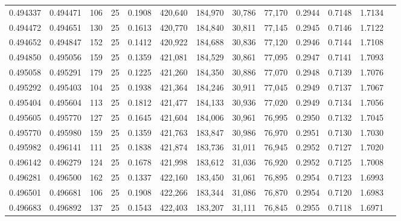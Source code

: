 \begin{tabular}{rrrrrrrrrrrrr}
0.494337 & 0.494471 &   106 &  25 &                                     0.1908 & 420,640 & 184,970 &  30,786 &  77,170 & 0.2944 & 0.7148 & 1.7134 \\
0.494472 & 0.494651 &   130 &  25 &                                     0.1613 & 420,770 & 184,840 &  30,811 &  77,145 & 0.2945 & 0.7146 & 1.7122 \\
0.494652 & 0.494847 &   152 &  25 &                                     0.1412 & 420,922 & 184,688 &  30,836 &  77,120 & 0.2946 & 0.7144 & 1.7108 \\
0.494850 & 0.495056 &   159 &  25 &                                     0.1359 & 421,081 & 184,529 &  30,861 &  77,095 & 0.2947 & 0.7141 & 1.7093 \\
0.495058 & 0.495291 &   179 &  25 &                                     0.1225 & 421,260 & 184,350 &  30,886 &  77,070 & 0.2948 & 0.7139 & 1.7076 \\
0.495292 & 0.495403 &   104 &  25 &                                     0.1938 & 421,364 & 184,246 &  30,911 &  77,045 & 0.2949 & 0.7137 & 1.7067 \\
0.495404 & 0.495604 &   113 &  25 &                                     0.1812 & 421,477 & 184,133 &  30,936 &  77,020 & 0.2949 & 0.7134 & 1.7056 \\
0.495605 & 0.495770 &   127 &  25 &                                     0.1645 & 421,604 & 184,006 &  30,961 &  76,995 & 0.2950 & 0.7132 & 1.7045 \\
0.495770 & 0.495980 &   159 &  25 &                                     0.1359 & 421,763 & 183,847 &  30,986 &  76,970 & 0.2951 & 0.7130 & 1.7030 \\
0.495982 & 0.496141 &   111 &  25 &                                     0.1838 & 421,874 & 183,736 &  31,011 &  76,945 & 0.2952 & 0.7127 & 1.7020 \\
0.496142 & 0.496279 &   124 &  25 &                                     0.1678 & 421,998 & 183,612 &  31,036 &  76,920 & 0.2952 & 0.7125 & 1.7008 \\
0.496281 & 0.496500 &   162 &  25 &                                     0.1337 & 422,160 & 183,450 &  31,061 &  76,895 & 0.2954 & 0.7123 & 1.6993 \\
0.496501 & 0.496681 &   106 &  25 &                                     0.1908 & 422,266 & 183,344 &  31,086 &  76,870 & 0.2954 & 0.7120 & 1.6983 \\
0.496683 & 0.496892 &   137 &  25 &                                     0.1543 & 422,403 & 183,207 &  31,111 &  76,845 & 0.2955 & 0.7118 & 1.6971 \\

\end{tabular}
